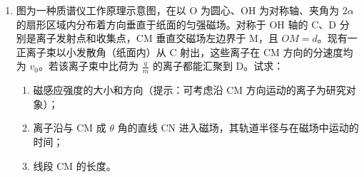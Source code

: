 \documentclass[\gkver]{gaokaozhenti}
\begin{document}
\begin{enumerate}
{（2）设加速度大小为 $a$，有 $2as=v_{1}^{2}$，得 $a=\frac{kL}{8m}$。

（3）设弹簧弹力为 $F_{N}$，ER 流体对滑块的阻力为 $F_{ER}$，对整体受力分析如图所示。


对整体有 $F_{N}+F_{ER}-2mg=2ma$，又 $F_{N}=kx$，$x=d+\frac{mg}{k}$，联立解得 $F_{ER}=mg+\frac{kL}{4}-kd$。
}

\item
图为一种质谱仪工作原理示意图，在以 O 为圆心、OH 为对称轴、夹角为 $2\alpha$ 的扇形区域内分布着方向垂直于纸面的匀强磁场。对称于 OH 轴的 C、D 分别是离子发射点和收集点，CM 垂直交磁场左边界于 M，且 $OM=d$。现有一正离子束以小发散角（纸面内）从 C 射出，这些离子在 CM 方向的分速度均为 $v_{0}$。若该离子束中比荷为 $\frac{q}{m}$ 的离子都能汇聚到 D。试求：

\begin{enumerate}
	\item
	磁感应强度的大小和方向（提示：可考虑沿 CM 方向运动的离子为研究对象）；
	\item
	离子沿与 CM 成 $\theta$ 角的直线 CN 进入磁场，其轨道半径与在磁场中运动的时间；
	\item
	线段 CM 的长度。
\end{enumerate}




\end{enumerate}
\end{document}
